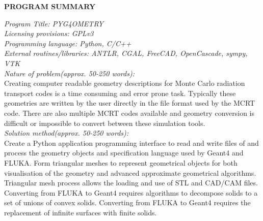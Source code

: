 \documentclass[final,5p,times,twocolumn]{elsarticle}
\begin{document}
{\bf PROGRAM SUMMARY}

\begin{small}
\noindent
{\em Program Title: PYG4OMETRY }                                         		\\
{\em Licensing provisions: GPLv3 }							\\
{\em Programming language: Python, C/C++}                         		\\
{\em External routines/libraries: ANTLR, CGAL, FreeCAD, OpenCascade, sympy, VTK}           	\\


{\em Nature of problem(approx. 50-250 words):}\\
Creating computer readable geometry descriptions for Monte Carlo radiation transport codes is a time consuming and error prone task. 
Typically these geometries are written by the user directly in the file format used by the MCRT code. There are also multiple MCRT codes 
available and geometry conversion is difficult or impossible to convert between these simulation tools. 
\\
{\em Solution method(approx. 50-250 words):}\\
Create a Python application programming interface to read and write files of and process the geometry objects and specification 
language used by Geant4 and FLUKA. Form triangular meshes to represent geometrical objects for both visualisation of the 
geometry and advanced approximate geometrical algorithms. Triangular mesh process allows the loading and use of STL and CAD/CAM 
files. Converting from FLUKA to Geant4 requires algorithms to decompose solids to a set of unions of convex solids. Converting from 
FLUKA to Geant4 requires the replacement of infinite surfaces with finite solids. 
 

\end{small}
\end{document}
